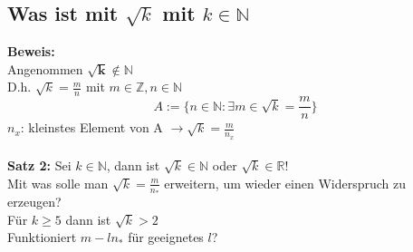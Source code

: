 \documentclass{article}
\begin{document}
        \subsection{Was ist mit $\sqrt{k}$ mit $k\in \mathbb{N}$}
            \textbf{Beweis:}\\
            Angenommen $\sqrt{\textbf{k}}\notin \mathbb{N}$\\
            D.h. $\sqrt{k}=\frac{m}{n}$ mit $m \in \mathbb{Z}, n\in\mathbb{N}$\\
            $$A:=\{ n \in \mathbb{N}: \exists m\in \sqrt{k}=\frac{m}{n}\}$$
            $n_x$: kleinstes Element von A $\to \sqrt{k}=\frac{m}{n_x}$\\\\
            \textbf{Satz 2:} Sei $k\in \mathbb{N}$, dann ist $\sqrt{k}\in \mathbb{N}$ oder $ \sqrt{k} \in \mathbb{R}$!\\
            Mit was solle man $\sqrt{k}=\frac{m}{n_*}$ erweitern, um wieder einen Widerspruch zu erzeugen?\\
            Für $k\ge 5$ dann ist $\sqrt{k}>2$\\
            Funktioniert $m-ln_*$ für geeignetes $l$?
        
            
\end{document}

